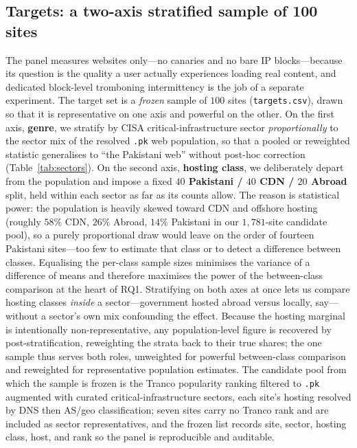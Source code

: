 \documentclass[conference]{IEEEtran}
\begin{document}
\subsection{Targets: a two-axis stratified sample of 100 sites}
\label{sec:targets}
The panel measures websites only---no canaries and no bare IP blocks---because its question is the
quality a user actually experiences loading real content, and dedicated block-level tromboning
intermittency is the job of a separate experiment. The target set is a \emph{frozen} sample of
$100$ sites (\texttt{targets.csv}), drawn so that it is representative on one axis and powerful on
the other. On the first axis, \textbf{genre}, we stratify by CISA critical-infrastructure sector
\emph{proportionally} to the sector mix of the resolved \texttt{.pk} web population, so that a
pooled or reweighted statistic generalises to ``the Pakistani web'' without post-hoc correction
(Table~\ref{tab:sectors}). On the second axis, \textbf{hosting class}, we deliberately depart from
the population and impose a fixed \textbf{$40$ Pakistani / $40$ CDN / $20$ Abroad} split, held
within each sector as far as its counts allow. The reason is statistical power: the population is
heavily skewed toward CDN and offshore hosting (roughly $58\%$ CDN, $26\%$ Abroad, $14\%$ Pakistani
in our $1{,}781$-site candidate pool), so a purely proportional draw would leave on the order of
fourteen Pakistani sites---too few to estimate that class or to detect a difference between classes.
Equalising the per-class sample sizes minimises the variance of a difference of means and therefore
maximises the power of the between-class comparison at the heart of RQ1. Stratifying on both axes at
once lets us compare hosting classes \emph{inside} a sector---government hosted abroad versus
locally, say---without a sector's own mix confounding the effect. Because the hosting marginal is
intentionally non-representative, any population-level figure is recovered by post-stratification,
reweighting the strata back to their true shares; the one sample thus serves both roles, unweighted
for powerful between-class comparison and reweighted for representative population estimates. The
candidate pool from which the sample is frozen is the Tranco popularity ranking filtered to
\texttt{.pk} augmented with curated critical-infrastructure sectors, each site's hosting resolved by
DNS then AS/geo classification; seven sites carry no Tranco rank and are included as sector
representatives, and the frozen list records site, sector, hosting class, host, and rank so the
panel is reproducible and auditable.
\end{document}
